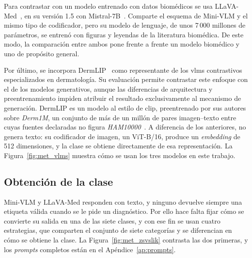 Para contrastar con un modelo entrenado con datos biomédicos se usa LLaVA-Med~\cite{li2023llavamed}, en su versión 1.5
con Mistral-7B~\cite{jiang2023mistral}. Comparte el esquema de Mini-VLM y el mismo tipo de codificador, pero su modelo
de lenguaje, de unos 7\,000 millones de parámetros, se entrenó con figuras y leyendas de la literatura biomédica. De
este modo, la comparación entre ambos pone frente a frente un modelo biomédico y uno de propósito general.

Por último, se incorpora DermLIP~\cite{yan2025derm1miccv} como representante de los \glspl{vlm} contrastivos especializados en dermatología. Su evaluación permite contrastar este enfoque con el de los modelos generativos, aunque las diferencias de arquitectura y preentrenamiento impiden atribuir el resultado exclusivamente al mecanismo de generación. DermLIP es un modelo al estilo de \gls{clip}, preentrenado por sus autores sobre \emph{Derm1M}, un conjunto de más de un millón de pares imagen--texto entre cuyas fuentes declaradas no figura
\emph{HAM10000}~\cite{yan2025derm1miccv}.
A diferencia de los anteriores, no genera texto: su codificador de imagen, un ViT-B/16, produce un \emph{embedding} de
512 dimensiones, y la clase se obtiene directamente de esa representación. La Figura~\ref{fig:met_vlms} muestra cómo
se usan los tres modelos en este trabajo.



\subsection{Obtención de la clase}
\label{sec:met_vlm_estrategias}

Mini-VLM y LLaVA-Med responden con texto, y ninguno devuelve siempre una etiqueta válida cuando se le pide un
diagnóstico. Por ello hace falta fijar cómo se convierte su salida en una de las siete clases, y con ese fin se usan
cuatro estrategias, que comparten el conjunto de siete categorías y se diferencian en cómo se obtiene la clase. La
Figura~\ref{fig:met_zsvslik} contrasta las dos primeras, y los \emph{prompts} completos están en el
Apéndice~\ref{ap:prompts}.

